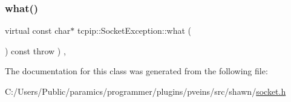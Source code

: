 \subsubsection{\texorpdfstring{what()}{what()}}
{\footnotesize\ttfamily virtual const char$\ast$ tcpip\+::\+Socket\+Exception\+::what (\begin{DoxyParamCaption}{ }\end{DoxyParamCaption}) const throw  ) \hspace{0.3cm}{\ttfamily [inline]}, {\ttfamily [virtual]}}



The documentation for this class was generated from the following file\+:\begin{DoxyCompactItemize}
\item 
C\+:/\+Users/\+Public/paramics/programmer/plugins/pveins/src/shawn/\hyperlink{socket_8h}{socket.\+h}\end{DoxyCompactItemize}
